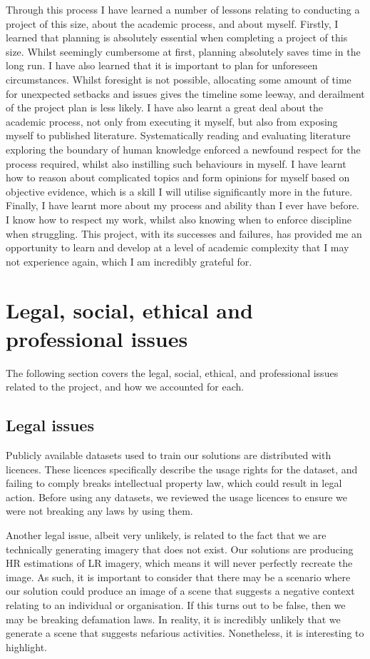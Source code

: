 \begin{appendices}
Through this process I have learned a number of lessons relating to conducting a project of this size, about the academic process, and about myself. Firstly, I learned that planning is absolutely essential when completing a project of this size. Whilst seemingly cumbersome at first, planning absolutely saves time in the long run. I have also learned that it is important to plan for unforeseen circumstances. Whilst foresight is not possible, allocating some amount of time for unexpected setbacks and issues gives the timeline some leeway, and derailment of the project plan is less likely. I have also learnt a great deal about the academic process, not only from executing it myself, but also from exposing myself to published literature. Systematically reading and evaluating literature exploring the boundary of human knowledge enforced a newfound respect for the process required, whilst also instilling such behaviours in myself. I have learnt how to reason about complicated topics and form opinions for myself based on objective evidence, which is a skill I will utilise significantly more in the future. Finally, I have learnt more about my process and ability than I ever have before. I know how to respect my work, whilst also knowing when to enforce discipline when struggling. This project, with its successes and failures, has provided me an opportunity to learn and develop at a level of academic complexity that I may not experience again, which I am incredibly grateful for.

\section{Legal, social, ethical and professional issues}
The following section covers the legal, social, ethical, and professional issues related to the project, and how we accounted for each.

\subsection{Legal issues}
Publicly available datasets used to train our solutions are distributed with licences. These licences specifically describe the usage rights for the dataset, and failing to comply breaks intellectual property law, which could result in legal action. Before using any datasets, we reviewed the usage licences to ensure we were not breaking any laws by using them.

Another legal issue, albeit very unlikely, is related to the fact that we are technically generating imagery that does not exist. Our solutions are producing HR estimations of LR imagery, which means it will never perfectly recreate the image. As such, it is important to consider that there may be a scenario where our solution could produce an image of a scene that suggests a negative context relating to an individual or organisation. If this turns out to be false, then we may be breaking defamation laws. In reality, it is incredibly unlikely that we generate a scene that suggests nefarious activities. Nonetheless, it is interesting to highlight.


\end{appendices}
